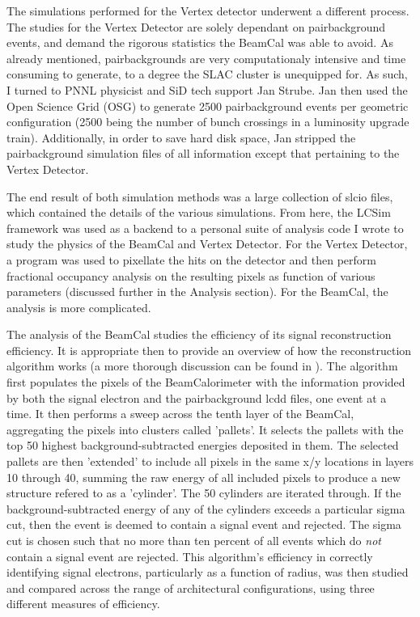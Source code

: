 \documentclass{report}
\begin{document}
            The simulations performed for the Vertex detector underwent a different process. The studies for the Vertex Detector are solely dependant on pairbackground events, and demand the rigorous statistics the BeamCal was able to avoid. As already mentioned, pairbackgrounds are very computationaly intensive and time consuming to generate, to a degree the SLAC cluster is unequipped for. As such, I turned to PNNL physicist and SiD tech support Jan Strube. Jan then used the Open Science Grid (OSG) to generate 2500 pairbackground events per geometric configuration (2500 being the number of bunch crossings in a luminosity upgrade train). Additionally, in order to save hard disk space, Jan stripped the pairbackground simulation files of all information except that pertaining to the Vertex Detector. 

            The end result of both simulation methods was a large collection of slcio files, which contained the details of the various simulations. From here, the LCSim framework was used as a backend to a personal suite of analysis code I wrote to study the physics of the BeamCal and Vertex Detector. For the Vertex Detector, a program was used to pixellate the hits on the detector and then perform fractional occupancy analysis on the resulting pixels as function of various parameters (discussed further in the Analysis section). For the BeamCal, the analysis is more complicated.
            
            The analysis of the BeamCal studies the efficiency of its signal reconstruction efficiency. It is appropriate then to provide an overview of how the reconstruction algorithm works (a more thorough discussion can be found in \cite{bogert_thesis}). The algorithm first populates the pixels of the BeamCalorimeter with the information provided by both the signal electron and the pairbackground lcdd files, one event at a time. It then performs a sweep across the tenth layer of the BeamCal, aggregating the pixels into clusters called 'pallets'. It selects the pallets with the top 50 highest background-subtracted energies deposited in them. The selected pallets are then 'extended' to include all pixels in the same x/y locations in layers 10 through 40, summing the raw energy of all included pixels to produce a new structure refered to as a 'cylinder'. The 50 cylinders are iterated through. If the background-subtracted energy of any of the cylinders exceeds a particular sigma cut, then the event is deemed to contain a signal event and rejected. The sigma cut is chosen such that no more than ten percent of all events which do \textit{not} contain a signal event are rejected. This algorithm's efficiency in correctly identifying signal electrons, particularly as a function of radius, was then studied and compared across the range of architectural configurations, using three different measures of efficiency.
\end{document}
